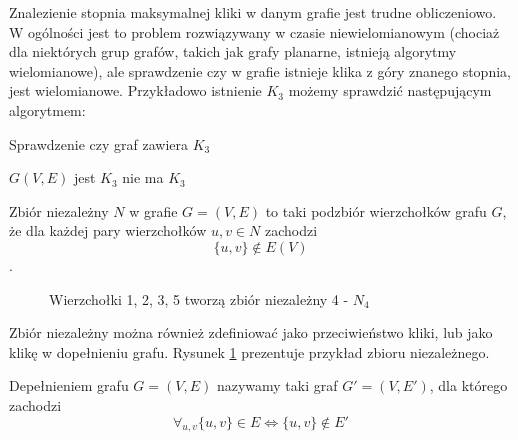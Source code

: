   Znalezienie stopnia maksymalnej kliki w danym grafie jest trudne obliczeniowo.
  W ogólności jest to problem rozwiązywany w czasie niewielomianowym (chociaż dla niektórych grup grafów, 
  takich jak grafy planarne, istnieją algorytmy wielomianowe), ale sprawdzenie czy w grafie istnieje klika
  z góry znanego stopnia, jest wielomianowe. Przykładowo istnienie $K_3$ możemy sprawdzić następującym algorytmem:
  
  
  \begin{algorithm}
    \caption{Sprawdzenie czy graf zawiera $K_3$}
    \begin{algorithmic}
    \REQUIRE $G(V, E) $
          \STATE \RETURN jest $K_3$
        \ENDIF
      \ENDFOR
    \ENDFOR
    \STATE \RETURN nie ma $K_3$
    \end{algorithmic}
  \end{algorithm}
  
  
  \begin{definition}
    Zbiór niezależny $N$ w grafie $G=(V,E)$ to taki podzbiór wierzchołków grafu $G$, że dla każdej pary wierzchołków $u, v \in N$ zachodzi $$\{u,v\} \notin E(V) $$. 
  \end{definition}

    \begin{figure}[H]
      \centering
        \caption{Wierzchołki 1, 2, 3, 5 tworzą zbiór niezależny 4 - $N_4$ }
        \label{zniez}
     \end{figure}


     Zbiór niezależny można również zdefiniować jako przeciwieństwo kliki, lub jako klikę w dopełnieniu grafu. Rysunek \ref{zniez} prezentuje przykład zbioru niezależnego.

    \begin{definition}
      Depełnieniem grafu $G=(V,E)$ nazywamy taki graf $G'=(V,E')$, 
      dla którego zachodzi 
      $$\forall_{u,v} \{u,v\} \in E \iff \{u,v\} \notin E'$$
    \end{definition}
  
